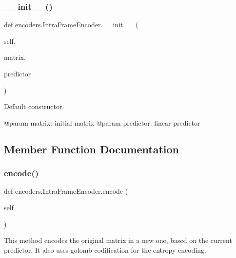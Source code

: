 \subsubsection{\texorpdfstring{\+\_\+\+\_\+init\+\_\+\+\_\+()}{\_\_init\_\_()}}
{\footnotesize\ttfamily def encoders.\+Intra\+Frame\+Encoder.\+\_\+\+\_\+init\+\_\+\+\_\+ (\begin{DoxyParamCaption}\item[{}]{self,  }\item[{}]{matrix,  }\item[{}]{predictor }\end{DoxyParamCaption})}

\begin{DoxyVerb}Default constructor.

@param matrix: initial matrix
@param predictor: linear predictor
\end{DoxyVerb}
 

\subsection{Member Function Documentation}
\mbox{\label{classencoders_1_1IntraFrameEncoder_ab8f41032eb1b0db6f300721c49924c7b}} 
\subsubsection{\texorpdfstring{encode()}{encode()}}
{\footnotesize\ttfamily def encoders.\+Intra\+Frame\+Encoder.\+encode (\begin{DoxyParamCaption}\item[{}]{self }\end{DoxyParamCaption})}

\begin{DoxyVerb}This method encodes the original matrix in a new one, based on the current predictor.
It also uses golomb codification for the entropy encoding.
\end{DoxyVerb}
 \mbox{\label{classencoders_1_1IntraFrameEncoder_afd51a089d10686691e32b453880c3e17}} 
